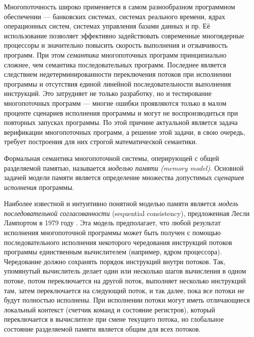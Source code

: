 
{\actuality} 
Многопоточность широко применяется в самом разнообразном программном обеспечении ---
банковских системах, системах реального времени, ядрах операционных систем,
системах управления базами данных и пр.
Её использование позволяет эффективно задействовать современные многоядерные процессоры и
значительно повысить скорость выполнения и отзывчивость программ.
При этом \emph{семантика} многопоточных программ принципиально сложнее,
чем семантика последовательных программ.
Последнее является следствием недетерминированности переключения потоков при исполнении
программы и отсутствия единой линейной последовательности выполнения инструкций.
Это затрудняет не только разработку, но и тестирование многопоточных программ  --- 
многие ошибки проявляются только в малом проценте сценариев исполнения программы и 
могут не воспроизводиться при повторных запусках программы.
По этой причине актуальной является задача верификации многопоточных программ, а
решение этой задачи, в свою очередь, требует построения  для них 
строгой математической  семантики.

Формальная семантика многопоточной системы, оперирующей с общей разделяемой памятью,
называется \emph{моделью памяти (memory model)}. 
Основной задачей модели памяти является определение множества 
допустимых \emph{сценариев исполнения} программы.

Наиболее известной и интуитивно понятной моделью памяти является 
\emph{модель последовательной согласованности} (sequential consistency),
предложенная Лесли Лампортом в 1979 году \cite{Lamport:TC79}.
Эта модель предполагает, что любой результат исполнения многопоточной программы может быть
получен с помощью последовательного исполнения некоторого чередования инструкций потоков программы
единственным вычислителем (например, ядром процессора).
Чередование должно сохранять порядок инструкций внутри потоков.
Так, упомянутый вычислитель делает один или несколько шагов вычисления в одном потоке, потом переключается на другой поток,
выполняет несколько инструкций там, затем переключается на следующий поток, и так далее, пока
все потоки не будут полностью исполнены. 
При исполнении потоки могут иметь отличающиеся локальный контекст
(счетчик команд и состояние регистров),
который переключается в вычислителе при смене текущего потока, 
но глобальное состояние разделяемой памяти является общим для всех потоков.

